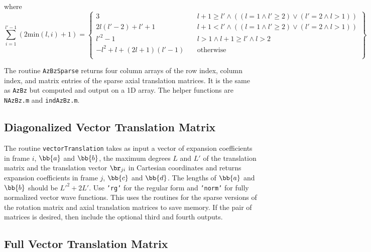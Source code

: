 \noindent where
\begin{equation}
\sum_{i = 1}^{l'-1}  (2\textrm{min}(l,i) + 1) = 
\left\{\begin{array}{ccc} 
3 & \ & l + 1 \ge l' \land ((l=1 \land l' \ge 2) \lor (l' = 2 \land l > 1 )) \\
2l(l'-2) + l' + 1 & \ & l + 1 < l' \land ((l=1 \land l' \ge 2) \lor (l' = 2 \land l > 1 )) \\
l'^2 - 1  & \ & l > 1 \land l+1 \ge l' \land l > 2 \\
-l^2 + l + (2l + 1)(l'-1)& \ & \textrm{otherwise} \\
\end{array}
\right\}
\end{equation}  


The routine \texttt{AzBzSparse} returns four column arrays of the row index, column index, and matrix entries of the sparse axial translation matrices.  It is the same as \texttt{AzBz} but computed and output on a 1D array.  The helper functions are \texttt{NAzBz.m} and \texttt{indAzBz.m}.


{\scriptsize
{}
}

{\scriptsize
{}
}

{\scriptsize
{}
}

\clearpage
\subsection{Diagonalized Vector Translation Matrix}


The routine \texttt{vectorTranslation} takes as input a vector of expansion coefficients in frame $i$, $\bb{a}$ and $\bb{b}$, the maximum degrees $L$ and $L'$ of the translation matrix and the translation vector $\br_{ji}$ in Cartesian coordinates and returns expansion coefficients in frame $j$, $\bb{c}$ and $\bb{d}$. The lengths of $\bb{a}$ and $\bb{b}$ should be $L'^2 + 2L' $.  Use \texttt{'rg'} for the regular form and \texttt{'norm'} for fully normalized vector wave functions. This uses the routines for the sparse versions of the rotation matrix and axial translation matrices to save memory.  If the pair of matrices is desired, then include the optional third and fourth outputs. 


{\scriptsize
{}
}
\clearpage

\subsection{Full Vector Translation Matrix}

